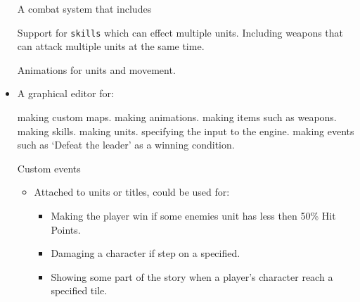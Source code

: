 \begin{itemize}
	
	\tick A combat system that includes 
	\begin{itemize}
		\tick Support for \texttt{skills} which can effect multiple units.
		\tick Including weapons that can attack multiple units at the same time. 
	\end{itemize}
	
	\tick Animations for units and movement.
	
	\item A graphical editor for:
	\begin{itemize}
		\tick   making custom maps.
		\tick   making animations.
		\tick   making items such as weapons.
		\tick   making skills. 
		\tick   making units.
		\cross  specifying the input to the engine.
		\cross  making events such as `Defeat the leader' as a winning condition.
	\end{itemize}
	
	\cross Custom events
	\begin{itemize}
		\item Attached to units or titles, could be used for:
		\begin{itemize}
			\item Making the player win if some enemies unit has less then 50\% Hit Points.
			
			\item Damaging a character if step on a specified.
			
			\item Showing some part of the story when a player's character reach a specified tile.
		\end{itemize}
	\end{itemize}
	
\end{itemize}